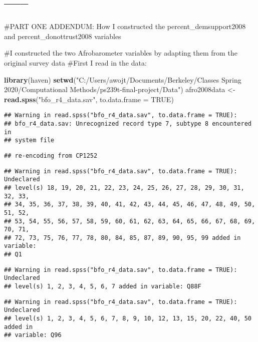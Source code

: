 \documentclass[]{article}
\newenvironment{Shaded}{\begin{snugshade}}{\end{snugshade}}
\newcommand{\DataTypeTok}[1]{\textcolor[rgb]{0.13,0.29,0.53}{#1}}
\newcommand{\KeywordTok}[1]{\textcolor[rgb]{0.13,0.29,0.53}{\textbf{#1}}}
\newcommand{\NormalTok}[1]{#1}
\newcommand{\OtherTok}[1]{\textcolor[rgb]{0.56,0.35,0.01}{#1}}
\newcommand{\StringTok}[1]{\textcolor[rgb]{0.31,0.60,0.02}{#1}}
\begin{document}
\hypertarget{section-1}{%
\section{-----}\label{section-1}}

\#PART ONE ADDENDUM: How I constructed the percent\_demsupport2008 and
percent\_donottrust2008 variables

\#I constructed the two Afrobarometer variables by adapting them from
the original survey data \#First I read in the data:

\begin{Shaded}
\begin{Highlighting}[]
\KeywordTok{library}\NormalTok{(haven)}
\KeywordTok{setwd}\NormalTok{(}\StringTok{"C:/Users/awojt/Documents/Berkeley/Classes Spring 2020/Computational Methods/ps239t{-}final{-}project/Data"}\NormalTok{)}
\NormalTok{afro2008data <{-}}\StringTok{ }\KeywordTok{read.spss}\NormalTok{(}\StringTok{"bfo\_r4\_data.sav"}\NormalTok{, }\DataTypeTok{to.data.frame =} \OtherTok{TRUE}\NormalTok{)}
\end{Highlighting}
\end{Shaded}

\begin{verbatim}
## Warning in read.spss("bfo_r4_data.sav", to.data.frame = TRUE):
## bfo_r4_data.sav: Unrecognized record type 7, subtype 8 encountered in
## system file
\end{verbatim}

\begin{verbatim}
## re-encoding from CP1252
\end{verbatim}

\begin{verbatim}
## Warning in read.spss("bfo_r4_data.sav", to.data.frame = TRUE): Undeclared
## level(s) 18, 19, 20, 21, 22, 23, 24, 25, 26, 27, 28, 29, 30, 31, 32, 33,
## 34, 35, 36, 37, 38, 39, 40, 41, 42, 43, 44, 45, 46, 47, 48, 49, 50, 51, 52,
## 53, 54, 55, 56, 57, 58, 59, 60, 61, 62, 63, 64, 65, 66, 67, 68, 69, 70, 71,
## 72, 73, 75, 76, 77, 78, 80, 84, 85, 87, 89, 90, 95, 99 added in variable:
## Q1
\end{verbatim}

\begin{verbatim}
## Warning in read.spss("bfo_r4_data.sav", to.data.frame = TRUE): Undeclared
## level(s) 1, 2, 3, 4, 5, 6, 7 added in variable: Q88F
\end{verbatim}

\begin{verbatim}
## Warning in read.spss("bfo_r4_data.sav", to.data.frame = TRUE): Undeclared
## level(s) 1, 2, 3, 4, 5, 6, 7, 8, 9, 10, 12, 13, 15, 20, 22, 40, 50 added in
## variable: Q96
\end{verbatim}
\end{document}
